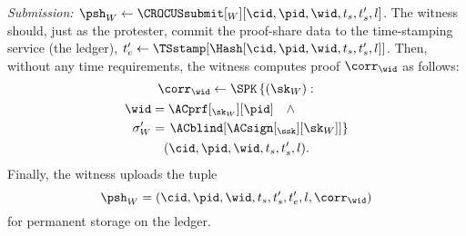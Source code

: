 \emph{Submission: \(\psh_W\gets \CROCUSsubmit[_W][\cid, \pid, \wid, t_s, t_s', 
    l]\).}
The witness should, just as the protester, commit the proof-share data to the 
time-stamping service (\ie the ledger), \(t_e'\gets \TSstamp[\Hash[\cid, \pid, \wid, t_s, t_s', 
  l]]\).
Then, without any time requirements, the witness computes  proof 
\(\corr_{\wid}\) as follows:
\begin{multline*}
  \corr_{\wid}\gets \SPK\left\{ (\sk_W) : \right. \\
    \begin{aligned}
      \wid &= \ACprf[_{\sk_W}][\pid] \quad \land \\
      \sigma_W' &= \left. \ACblind[\ACsign[_{\ssk}][\sk_W]] \right\}
    \end{aligned} \\
      (\cid, \pid, \wid, t_s, t_s', l).
\end{multline*}
Finally, the witness uploads the tuple \[
  \psh_W = (\cid, \pid, \wid, t_s, t_s', t_e', l, \corr_{\wid})
\] for permanent storage on the ledger.


